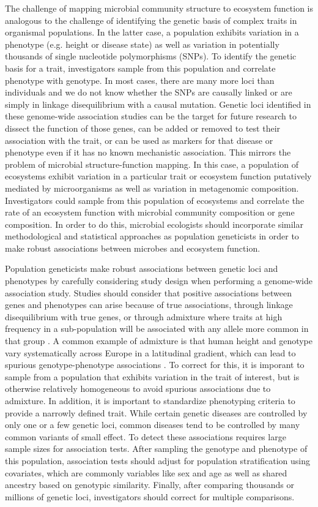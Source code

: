 \documentclass{article}
\begin{document}
The challenge of mapping microbial community structure to ecosystem function is
analogous to the challenge of identifying the genetic basis of complex traits in
organismal populations. In the latter case, a population exhibits variation in a
phenotype (e.g. height or disease state) as well as variation in potentially
thousands of single nucleotide polymorphisms
(SNPs). To identify the genetic basis for a trait, investigators sample from
this population and correlate phenotype with genotype. In most cases, there are
many more loci than individuals and we do not know whether the SNPs are causally
linked or are simply in linkage disequilibrium with a causal mutation. 
Genetic loci identified in these genome-wide association
studies can be the target for future research to dissect the function of those
genes, can be added or removed to test their association with the trait, or can
be used as markers for that disease or phenotype even if it has no known
mechanistic association. This mirrors the problem of microbial
structure-function mapping. In this case, a population of ecosystems exhibit
variation in a particular trait or ecosystem function putatively mediated by
microorganisms as well as variation in metagenomic composition. Investigators
could sample from this population of ecosystems and correlate the rate of an
ecosystem function with microbial community composition or gene composition. 
In order to do this, microbial ecologists should incorporate similar
methodological and statistical approaches as population geneticists in order to
make robust associations between microbes and ecosystem function.

Population geneticists make robust associations between genetic loci
and phenotypes by carefully considering study design when performing a genome-wide
association study. Studies should consider that positive associations between genes and
phenotypes can arise because of true associations, through linkage
disequilibrium with true genes, or through admixture where traits at high
frequency in a sub-population will be associated with any allele more common in
that group \citep{lander1994}. A common example of admixture is that human height and
genotype vary systematically across Europe in a latitudinal gradient, which can
lead to spurious genotype-phenotype associations \citep{novembre2008}. To
correct for this, it is
imporant to sample from a population that exhibits variation in the trait of
interest, but is otherwise relatively homogeneous
to avoid spurious associations due to admixture. In addition, it is important to standardize phenotyping
criteria to provide a narrowly defined trait. While certain genetic diseases are
controlled by only one or a few genetic loci, common diseases tend to be
controlled by many common variants of small effect. To detect these
associations requires large sample sizes for association tests. After
sampling the genotype and phenotype of this population, association tests should
adjust for population stratification using covariates, which are commonly
variables like sex and age as well as shared ancestry based on
genotypic similarity. Finally, after comparing thousands or millions of genetic
loci, investigators should correct for multiple comparisons.
\end{document}
